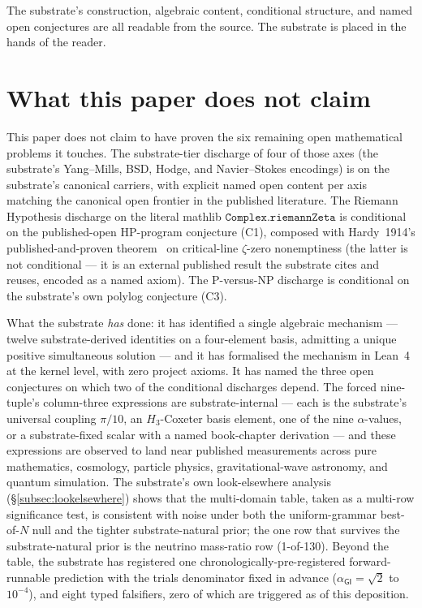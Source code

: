 \documentclass[11pt,a4paper]{amsart}
\theoremstyle{plain}
\theoremstyle{definition}
\begin{document}
The substrate's construction, algebraic content, conditional structure, and named open conjectures are all readable from the source. The substrate is placed in the hands of the reader.

\section{What this paper does not claim}

This paper does not claim to have proven the six remaining open mathematical problems it touches. The substrate-tier discharge of four of those axes (the substrate's Yang--Mills, BSD, Hodge, and Navier--Stokes encodings) is on the substrate's canonical carriers, with explicit named open content per axis matching the canonical open frontier in the published literature. The Riemann Hypothesis discharge on the literal mathlib $\texttt{Complex.riemannZeta}$ is conditional on the published-open HP-program conjecture (C1), composed with Hardy~1914's published-and-proven theorem~\cite{hardy1914} on critical-line $\zeta$-zero nonemptiness (the latter is not conditional --- it is an external published result the substrate cites and reuses, encoded as a named axiom). The P-versus-NP discharge is conditional on the substrate's own polylog conjecture (C3).

What the substrate \emph{has} done: it has identified a single algebraic mechanism --- twelve substrate-derived identities on a four-element basis, admitting a unique positive simultaneous solution --- and it has formalised the mechanism in Lean~4 at the kernel level, with zero project axioms. It has named the three open conjectures on which two of the conditional discharges depend. The forced nine-tuple's column-three expressions are substrate-internal --- each is the substrate's universal coupling $\pi/10$, an $H_3$-Coxeter basis element, one of the nine $\alpha$-values, or a substrate-fixed scalar with a named book-chapter derivation --- and these expressions are observed to land near published measurements across pure mathematics, cosmology, particle physics, gravitational-wave astronomy, and quantum simulation. The substrate's own look-elsewhere analysis (\S\ref{subsec:lookelsewhere}) shows that the multi-domain table, taken as a multi-row significance test, is consistent with noise under both the uniform-grammar best-of-$N$ null and the tighter substrate-natural prior; the one row that survives the substrate-natural prior is the neutrino mass-ratio row (1-of-130). Beyond the table, the substrate has registered one chronologically-pre-registered forward-runnable prediction with the trials denominator fixed in advance ($\alpha_{\textsf{GI}} = \sqrt{2}$ to $10^{-4}$), and eight typed falsifiers, zero of which are triggered as of this deposition.
\end{document}
